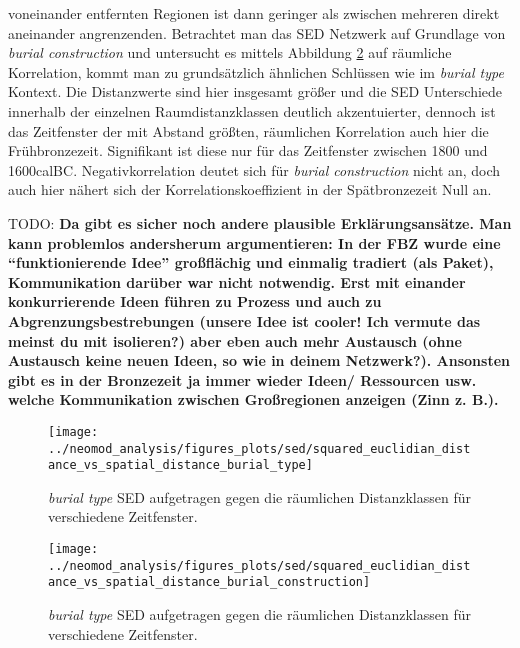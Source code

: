 \documentclass[openany,twoside,twocolumn]{book}
\begin{document}
voneinander entfernten Regionen ist dann geringer als zwischen mehreren
direkt aneinander angrenzenden. Betrachtet man das SED Netzwerk auf
Grundlage von \emph{burial construction} und untersucht es mittels
Abbildung \ref{fig:mantel-bc-spatial} auf räumliche Korrelation, kommt
man zu grundsätzlich ähnlichen Schlüssen wie im \emph{burial type}
Kontext. Die Distanzwerte sind hier insgesamt größer und die SED
Unterschiede innerhalb der einzelnen Raumdistanzklassen deutlich
akzentuierter, dennoch ist das Zeitfenster der mit Abstand größten,
räumlichen Korrelation auch hier die Frühbronzezeit. Signifikant ist
diese nur für das Zeitfenster zwischen 1800 und 1600calBC.
Negativkorrelation deutet sich für \emph{burial construction} nicht an,
doch auch hier nähert sich der Korrelationskoeffizient in der
Spätbronzezeit Null an.

TODO: \textbf{Da gibt es sicher noch andere plausible Erklärungsansätze.
Man kann problemlos andersherum argumentieren: In der FBZ wurde eine
``funktionierende Idee'' großflächig und einmalig tradiert (als Paket),
Kommunikation darüber war nicht notwendig. Erst mit einander
konkurrierende Ideen führen zu Prozess und auch zu
Abgrenzungsbestrebungen (unsere Idee ist cooler! Ich vermute das meinst
du mit isolieren?) aber eben auch mehr Austausch (ohne Austausch keine
neuen Ideen, so wie in deinem Netzwerk?). Ansonsten gibt es in der
Bronzezeit ja immer wieder Ideen/ Ressourcen usw. welche Kommunikation
zwischen Großregionen anzeigen (Zinn z. B.).}

\begin{landscape}
\begin{figure}
\texttt{[image: ../neomod\_analysis/figures\_plots/sed/squared\_euclidian\_distance\_vs\_spatial\_distance\_burial\_type]} \caption[\textit{burial type} SED aufgetragen gegen die räumlichen Distanzklassen für verschiedene Zeitfenster]{\textit{burial type} SED aufgetragen gegen die räumlichen Distanzklassen für verschiedene Zeitfenster.}\label{fig:mantel-bt-spatial}
\end{figure}
\end{landscape}

\begin{landscape}
\begin{figure}
\texttt{[image: ../neomod\_analysis/figures\_plots/sed/squared\_euclidian\_distance\_vs\_spatial\_distance\_burial\_construction]} \caption[\textit{burial type} SED aufgetragen gegen die räumlichen Distanzklassen für verschiedene Zeitfenster]{\textit{burial type} SED aufgetragen gegen die räumlichen Distanzklassen für verschiedene Zeitfenster.}\label{fig:mantel-bc-spatial}
\end{figure}
\end{landscape}
\end{document}
